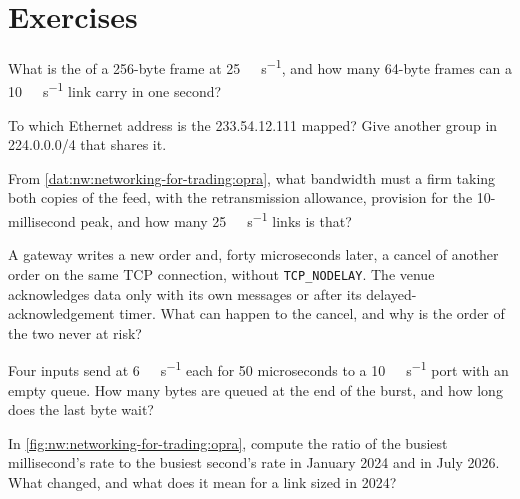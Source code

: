 \section{Exercises}

\begin{exercise}[$\star$]\label{exo:nw:networking-for-trading:1}
What is the  of a 256-byte frame at \qty{25}{\giga\bit\per\second}, and how many 64-byte frames can a
\qty{10}{\giga\bit\per\second} link carry in one second?
\end{exercise}

\begin{exercise}[$\star$]\label{exo:nw:networking-for-trading:2}
To which Ethernet address is the  233.54.12.111 mapped? Give another group in 224.0.0.0/4 that shares it.
\end{exercise}

\begin{exercise}[$\star$]\label{exo:nw:networking-for-trading:3}
From \cref{dat:nw:networking-for-trading:opra}, what bandwidth must a firm taking both copies of the feed, with the
retransmission allowance, provision for the 10-millisecond peak, and how many \qty{25}{\giga\bit\per\second} links is that?
\end{exercise}

\begin{exercise}[$\star\star$]\label{exo:nw:networking-for-trading:4}
A gateway writes a new order and, forty microseconds later, a cancel of another order on the same TCP connection, without
\texttt{TCP\_NODELAY}. The venue acknowledges data only with its own messages or after its delayed-acknowledgement timer. What
can happen to the cancel, and why is the order of the two never at risk?
\end{exercise}

\begin{exercise}[$\star\star$]\label{exo:nw:networking-for-trading:5}
Four inputs send at \qty{6}{\giga\bit\per\second} each for 50 microseconds to a \qty{10}{\giga\bit\per\second} port with an empty
queue. How many bytes are queued at the end of the burst, and how long does the last byte wait?
\end{exercise}

\begin{exercise}[$\star\star$]\label{exo:nw:networking-for-trading:6}
In \cref{fig:nw:networking-for-trading:opra}, compute the ratio of the busiest millisecond's rate to the busiest second's rate
in January 2024 and in July 2026. What changed, and what does it mean for a link sized in 2024?
\end{exercise}

